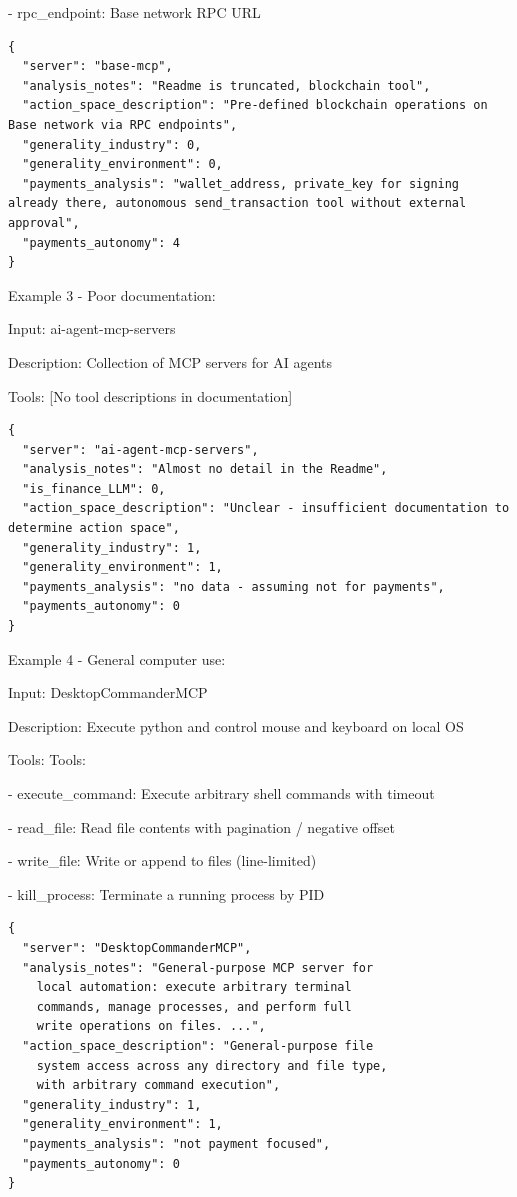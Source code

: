 \documentclass[manuscript,screen,nonacm,oneside]{acmart}
\begin{document}
- rpc\_endpoint: Base network RPC URL

\begin{lstlisting}
{
  "server": "base-mcp",
  "analysis_notes": "Readme is truncated, blockchain tool",
  "action_space_description": "Pre-defined blockchain operations on Base network via RPC endpoints",
  "generality_industry": 0,
  "generality_environment": 0,
  "payments_analysis": "wallet_address, private_key for signing already there, autonomous send_transaction tool without external approval",
  "payments_autonomy": 4
}
\end{lstlisting}

Example 3 - Poor documentation:

Input: ai-agent-mcp-servers

Description: Collection of MCP servers for AI agents

Tools: [No tool descriptions in documentation]

\begin{lstlisting}
{
  "server": "ai-agent-mcp-servers",
  "analysis_notes": "Almost no detail in the Readme",
  "is_finance_LLM": 0,
  "action_space_description": "Unclear - insufficient documentation to determine action space",
  "generality_industry": 1,
  "generality_environment": 1,
  "payments_analysis": "no data - assuming not for payments",
  "payments_autonomy": 0
}
\end{lstlisting}

Example 4 - General computer use:

Input: DesktopCommanderMCP

Description: Execute python and control mouse and keyboard on local OS

Tools: Tools:

- execute\_command: Execute arbitrary shell commands with timeout

- read\_file: Read file contents with pagination / negative offset

- write\_file: Write or append to files (line-limited)

- kill\_process: Terminate a running process by PID

\begin{lstlisting}
{
  "server": "DesktopCommanderMCP",
  "analysis_notes": "General-purpose MCP server for
    local automation: execute arbitrary terminal
    commands, manage processes, and perform full
    write operations on files. ...",
  "action_space_description": "General-purpose file
    system access across any directory and file type,
    with arbitrary command execution",
  "generality_industry": 1,
  "generality_environment": 1,
  "payments_analysis": "not payment focused",
  "payments_autonomy": 0
}
\end{lstlisting}
\end{document}
